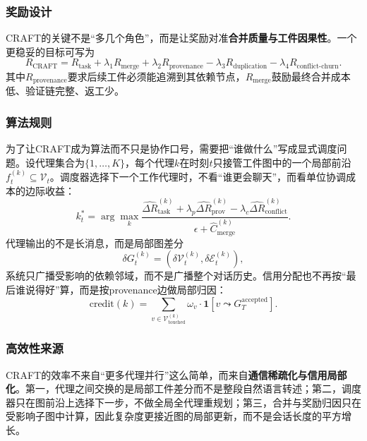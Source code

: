 \documentclass[12pt,a4paper]{article}
\begin{document}
\subsubsection{奖励设计}

CRAFT的关键不是“多几个角色”，而是让奖励对准\textbf{合并质量与工件因果性}。一个更稳妥的目标可写为
\begin{equation}
R_{\text{CRAFT}}
=
R_{\text{task}}
+ \lambda_1 R_{\text{merge}}
+ \lambda_2 R_{\text{provenance}}
- \lambda_3 R_{\text{duplication}}
- \lambda_4 R_{\text{conflict-churn}}.
\end{equation}
其中$R_{\text{provenance}}$要求后续工件必须能追溯到其依赖节点，$R_{\text{merge}}$鼓励最终合并成本低、验证链完整、返工少。

\subsubsection{算法规则}

为了让CRAFT成为算法而不只是协作口号，需要把“谁做什么”写成显式调度问题。设代理集合为$\{1,\dots,K\}$，每个代理$k$在时刻$t$只接管工件图中的一个局部前沿$f_t^{(k)} \subseteq \mathcal{V}_t$。调度器选择下一个工作代理时，不看“谁更会聊天”，而看单位协调成本的边际收益：
\begin{equation}
k_t^*
=
\arg\max_k
\frac{\widehat{\Delta R}_{\text{task}}^{(k)} + \lambda_p \widehat{\Delta R}_{\text{prov}}^{(k)} - \lambda_c \widehat{\Delta R}_{\text{conflict}}^{(k)}}
{\epsilon + \widehat{C}_{\text{merge}}^{(k)}}.
\end{equation}
代理输出的不是长消息，而是局部图差分
\begin{equation}
\delta G_t^{(k)} = (\delta \mathcal{V}_t^{(k)}, \delta \mathcal{E}_t^{(k)}),
\end{equation}
系统只广播受影响的依赖邻域，而不是广播整个对话历史。信用分配也不再按“最后谁说得好”算，而是按provenance边做局部归因：
\begin{equation}
\text{credit}(k)
=
\sum_{v \in \mathcal{V}^{(k)}_{\text{touched}}}
\omega_v \cdot \mathbf{1}[v \leadsto G_T^{\text{accepted}}].
\end{equation}

\subsubsection{高效性来源}

CRAFT的效率不来自“更多代理并行”这么简单，而来自\textbf{通信稀疏化与信用局部化}。第一，代理之间交换的是局部工件差分而不是整段自然语言转述；第二，调度器只在图前沿上选择下一步，不做全局全代理重规划；第三，合并与奖励归因只在受影响子图中计算，因此复杂度更接近图的局部更新，而不是会话长度的平方增长。
\end{document}
